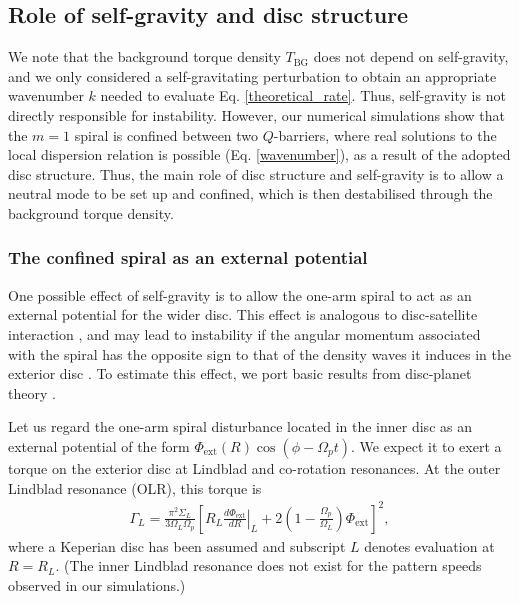 
\subsection{Role of self-gravity and disc structure} 
We note that the background torque density $T_\mathrm{BG}$ does not depend on  
self-gravity, and we only considered a self-gravitating perturbation to
obtain an appropriate wavenumber $k$ needed to evaluate
Eq. \ref{theoretical_rate}. Thus, self-gravity is not directly
responsible for instability. However, 
our numerical simulations show that the $m=1$ spiral is
confined between two $Q$-barriers, where real solutions to the local
dispersion relation is possible (Eq. \ref{wavenumber}), as a result of the adopted disc
structure. Thus, the main role of disc structure and self-gravity is to
allow a neutral mode to be set up and confined, which is then
destabilised through the background torque density. 


\subsubsection{The confined spiral as an external potential}
One possible effect of self-gravity is to allow the one-arm spiral 
to act as an external potential for the wider disc. This effect is
analogous to disc-satellite interaction 
\citep{goldreich79}, and may lead to instability 
if the angular momentum associated with the spiral has the opposite 
sign to that of the density waves it induces in the exterior disc
\citep{lin11b}. To estimate this effect, we port basic results from
disc-planet theory \citep[see, e.g.][and references
therein]{papaloizou07}. 

Let us regard the one-arm spiral disturbance located in the inner disc as an  
external potential of the form $\Phi_\mathrm{ext}(R)\cos{\left(\phi -
    \Omega_pt\right)}$. We expect
it to exert a torque on the exterior disc at Lindblad  
and co-rotation resonances. At the outer Lindblad resonance (OLR), this
torque is 
\begin{align}
  \Gamma_L =
  \frac{\pi^2\Sigma_L}{3\Omega_L\Omega_p}
\left[\left.R_L\frac{d\Phi_\mathrm{ext}}{dR}\right|_L + 2\left(1 - \frac{\Omega_p}{\Omega_L}\right)\Phi_\mathrm{ext}\right]^2,
\end{align}   
where a Keperian disc has been assumed and subscript $L$ denotes
evaluation at $R=R_L$. (The inner Lindblad resonance does not exist
for the pattern speeds observed in our simulations.)

